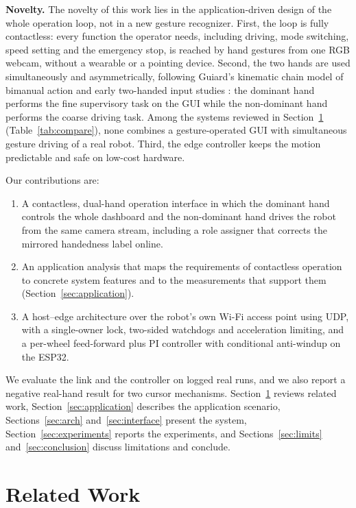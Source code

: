 \documentclass[5p,twocolumn]{elsarticle}
\begin{document}
\textbf{Novelty.} The novelty of this work lies in the application-driven design of the whole operation loop, not in a new gesture recognizer. First, the loop is fully contactless: every function the operator needs, including driving, mode switching, speed setting and the emergency stop, is reached by hand gestures from one RGB webcam, without a wearable or a pointing device. Second, the two hands are used simultaneously and asymmetrically, following Guiard's kinematic chain model of bimanual action \cite{guiard1987} and early two-handed input studies \cite{buxton1986}: the dominant hand performs the fine supervisory task on the GUI while the non-dominant hand performs the coarse driving task. Among the systems reviewed in Section~\ref{sec:related} (Table~\ref{tab:compare}), none combines a gesture-operated GUI with simultaneous gesture driving of a real robot. Third, the edge controller keeps the motion predictable and safe on low-cost hardware.

Our contributions are:
\begin{enumerate}
  \item A contactless, dual-hand operation interface in which the dominant hand controls the whole dashboard and the non-dominant hand drives the robot from the same camera stream, including a role assigner that corrects the mirrored handedness label online.
  \item An application analysis that maps the requirements of contactless operation to concrete system features and to the measurements that support them (Section~\ref{sec:application}).
  \item A host--edge architecture over the robot's own Wi-Fi access point using UDP, with a single-owner lock, two-sided watchdogs and acceleration limiting, and a per-wheel feed-forward plus PI controller with conditional anti-windup on the ESP32.
\end{enumerate}
We evaluate the link and the controller on logged real runs, and we also report a negative real-hand result for two cursor mechanisms. Section~\ref{sec:related} reviews related work, Section~\ref{sec:application} describes the application scenario, Sections~\ref{sec:arch} and~\ref{sec:interface} present the system, Section~\ref{sec:experiments} reports the experiments, and Sections~\ref{sec:limits} and~\ref{sec:conclusion} discuss limitations and conclude.

\section{Related Work}\label{sec:related}
\end{document}
